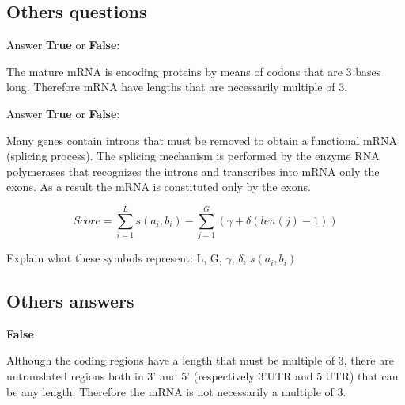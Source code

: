 \subsection{Others questions}

\begin{Exercise} [
  title={mRNA},
  difficulty={1},
  label={ex20},
  origin={G. Valle}
 ]

Answer \textbf{True} or \textbf{False}:

  \Question The mature mRNA is encoding proteins by means of codons that are
3 bases long. Therefore mRNA have lengths that are necessarily multiple of 3.

\end{Exercise}

\begin{Exercise} [
  title={Splicing},
  difficulty={1},
  label={ex21},
  origin={G. Valle}
 ]

Answer \textbf{True} or \textbf{False}:

  \Question Many genes contain introns that must be removed to obtain a
functional mRNA (splicing process).
The splicing mechanism is performed by the enzyme RNA polymerases that
recognizes the introns and transcribes into mRNA only the exons.
As a result the mRNA is constituted only by the exons.

\end{Exercise}

\begin{Exercise} [
  title={Objective function for alignment},
  difficulty={1},
  label={ex22},
  origin={G. Valle}
 ]

\begin{equation}
Score = \sum_{i=1}^{L} s(a_i,b_i) - \sum_{j=1}^{G} (\gamma + \delta(len(j)-1))
\end{equation}

  \Question Explain what these symbols represent: L, G, $\gamma$, $\delta$,
$s(a_i,b_i)$

\end{Exercise}

\subsection{Others answers}

\begin{Answer} [
   ref={ex20},
   number={20}
 ]

  \Question \textbf{False}

Although the coding regions have a length that must be multiple of 3, there are untranslated regions both in 3' and 5' (respectively 3'UTR and 5'UTR) that can be any length. Therefore the mRNA is not necessarily a multiple of 3.

\end{Answer}


